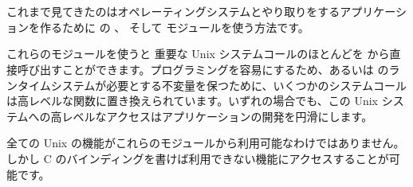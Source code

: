 %
%

\chapter*{\label{sec/more}}

これまで見てきたのはオペレーティングシステムとやり取りをするアプリケーションを作るために \ocaml の 、  そして  モジュールを使う方法です。

これらのモジュールを使うと 重要な Unix システムコールのほとんどを \ocaml から直接呼び出すことができます。プログラミングを容易にするため、あるいは \ocaml のランタイムシステムが必要とする不変量を保つために、いくつかのシステムコールは高レベルな関数に置き換えられています。いずれの場合でも、この Unix システムへの高レベルなアクセスはアプリケーションの開発を円滑にします。

全ての Unix の機能がこれらのモジュールから利用可能なわけではありません。しかし C のバインディングを書けば利用できない機能にアクセスすることが可能です。

